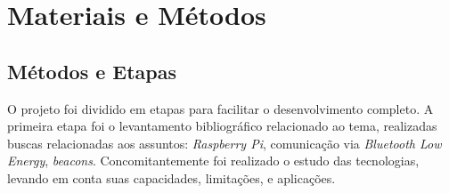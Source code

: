 \documentclass[
		12pt,				%
		openright,			%
		oneside,			%
		a4paper,			%
		chapter=TITLE,		%
		english,			%
		brazil				%
	]{abntex2}
\begin{document}



\textual

















\chapter{Materiais e Métodos}\label{cap:materiais-e-metodos}

\section{Métodos e Etapas}\label{sec:metodos-etapas}

O projeto foi dividido em etapas para facilitar o desenvolvimento completo. A primeira etapa foi o levantamento bibliográfico relacionado ao tema, realizadas buscas relacionadas aos assuntos: \textit{Raspberry Pi}, comunicação via \textit{Bluetooth Low Energy}, \textit{beacons}. Concomitantemente foi realizado o estudo das tecnologias, levando em conta suas capacidades, limitações, e aplicações.
\end{document}

